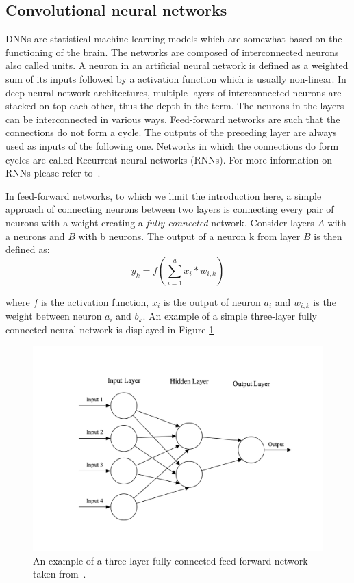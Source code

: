 \subsection{Convolutional neural networks}\label{subsec:convolutional-neural-networks}
DNNs are statistical machine learning models which are somewhat based on the functioning of the brain.
The networks are composed of interconnected neurons also called units.
A neuron in an artificial neural network is defined as a weighted sum of its inputs followed by a activation function which is usually non-linear.
In deep neural network architectures, multiple layers of interconnected neurons are stacked on top each other, thus the depth in the term.
The neurons in the layers can be interconnected in various ways.
Feed-forward networks are such that the connections do not form a cycle.
The outputs of the preceding layer are always used as inputs of the following one. 
Networks in which the connections do form cycles are called Recurrent neural networks (RNNs). 
For more information on RNNs please refer to~\cite{reccurent-neural-networks}.

In feed-forward networks, to which we limit the introduction here, a simple approach of connecting neurons between two layers is connecting every pair of neurons with a weight creating a \textit{fully connected} network. 
Consider layers $A$ with a neurons and $B$ with b neurons.
The output of a neuron k from layer $B$ is then defined as:
\begin{equation}
    y_k=f(\sum_{i=1}^{a}x_i*w_{i,k})
\end{equation}

where $f$ is the activation function, $x_i$ is the output of neuron $a_i$ and $w_{i, k}$ is the weight between neuron $a_i$ and $b_k$. An example of a simple three-layer fully connected neural network is displayed in Figure \ref{fig:simple-net}
\begin{figure}[!htpb]
\centering
   \includegraphics[width=0.8\linewidth]{img/ch2/simple-net}
   \caption[Feed-forward network example]{An example of a three-layer fully connected feed-forward network taken from~\cite{conv-intro}.}
    \label{fig:simple-net}
\end{figure}

